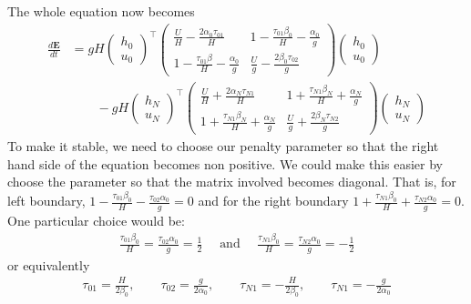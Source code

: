 \documentclass{article}
\newcommand{\half}{\frac{1}{2}}
\theoremstyle{definition}
\begin{document}
    The whole equation now becomes
    \begin{align}
        \frac{d\mathbf{E}}{dt}  &=     gH
        \begin{pmatrix}
            h_0 \\ u_0
        \end{pmatrix}^\top 
        \begin{pmatrix}
        \frac{U}{H} - \frac{2\alpha_0 \tau_{01}}{H} & 1 - \frac{\tau_{01}\beta_0}{H} - \frac{\alpha_0}{g} \\
        1 - \frac{\tau_{01}\beta}{H} - \frac{\alpha_0}{g} & \frac{U}{g} - \frac{2\beta_0\tau_{02}}{g}
        \end{pmatrix}
        \begin{pmatrix}
            h_0 \\ u_0
        \end{pmatrix} \nonumber \\
        & \qquad -gH
        \begin{pmatrix}
            h_N \\ u_N
        \end{pmatrix}^\top 
        \begin{pmatrix}
        \frac{U}{H} +\frac{2\alpha_N \tau_{N1}}{H} & 1 + \frac{\tau_{N1}\beta_N}{H} + \frac{\alpha_N}{g} \\
        1 + \frac{\tau_{N1}\beta_N}{H} + \frac{\alpha_N}{g} & \frac{U}{g} + \frac{2\beta_N\tau_{N2}}{g}
        \end{pmatrix}
        \begin{pmatrix}
            h_N \\ u_N
        \end{pmatrix}
        \label{swe-sat-mat3}
    \end{align}
    To make it stable, we need to choose our penalty parameter
    so that the right hand side of the equation becomes non positive.
    We could make this easier by choose the parameter so that the matrix involved 
    becomes diagonal. That is, for left boundary, 
    $1 - \frac{\tau_{01}\beta_0}{H} - \frac{\tau_{02}\alpha_0}{g} = 0$ and 
    for the right boundary $1 + \frac{\tau_{N1}\beta_0}{H} + \frac{\tau_{N2}\alpha_0}{g} = 0$. 
    One particular choice would be: 
    \begin{align}
        \frac{\tau_{01}\beta_0}{H} = \frac{\tau_{02}\alpha_0}{g} = \half
        \quad \text{ and } \quad 
        \frac{\tau_{N1}\beta_0}{H} = \frac{\tau_{N2}\alpha_0}{g} = -\half
    \end{align}
    or equivalently
    \begin{align}
        \tau_{01} =  \frac{H}{2\beta_0}, \qquad
        \tau_{02} =  \frac{g}{2\alpha_0}, \qquad
        \tau_{N1} = -\frac{H}{2\beta_0}, \qquad
        \tau_{N1} = -\frac{g}{2\alpha_0}
    \end{align}
\end{document}
